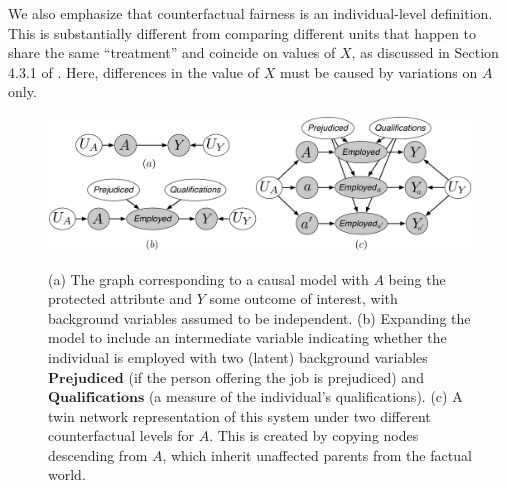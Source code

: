 We also emphasize that counterfactual fairness is an
individual-level definition. This is substantially different
from comparing different units that happen to share the
same ``treatment'' and coincide on values of $X$, as discussed in
Section 4.3.1 of \citep{pearl:16}. Here, differences in the value
of $X$ must be caused by variations on $A$ only.

\begin{figure}
\begin{center}
\vspace{-1ex}
\centerline{\includegraphics[width=\columnwidth]{implications_fig.pdf}}
\vspace{-2ex}
\label{fig:ex1}
  \caption{(a) The graph corresponding to a causal model with $A$ being the protected attribute
    and $Y$ some outcome of interest, with background variables assumed to be independent.
    (b) Expanding the model to include an intermediate variable indicating whether the individual
    is employed with two (latent) background variables $\textbf{Prejudiced}$ (if the person  offering the job is prejudiced) and $\textbf{Qualifications}$ (a measure of the individual's qualifications). (c) A twin network representation of this system \citep{pearl:00}
    under two different counterfactual levels for $A$. This is created by copying nodes descending from $A$, which inherit unaffected parents from the factual world.\vspace{-5ex}}
\vspace{-2ex}
\end{center}
\end{figure}


